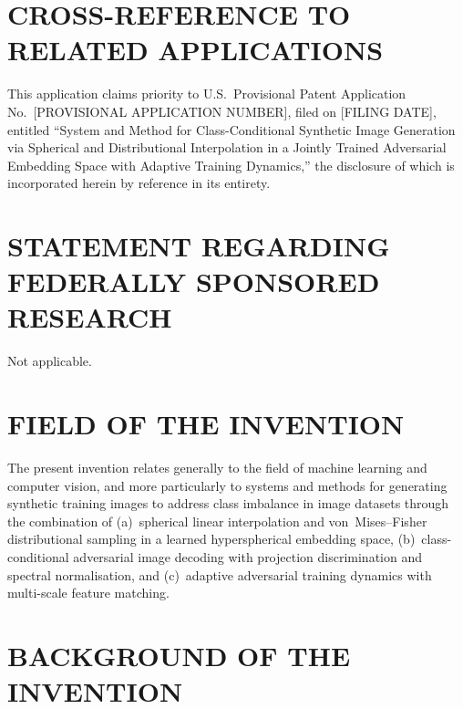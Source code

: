 \documentclass[12pt,letterpaper]{article}
\begin{document}
\newpage
\tableofcontents
\newpage

\section*{CROSS-REFERENCE TO RELATED APPLICATIONS}

This application claims priority to U.S.\ Provisional Patent Application
No.\ [PROVISIONAL APPLICATION NUMBER], filed on [FILING DATE], entitled
``System and Method for Class-Conditional Synthetic Image Generation via
Spherical and Distributional Interpolation in a Jointly Trained Adversarial
Embedding Space with Adaptive Training Dynamics,'' the disclosure of which
is incorporated herein by reference in its entirety.

\section*{STATEMENT REGARDING FEDERALLY SPONSORED RESEARCH}

Not applicable.

\section*{FIELD OF THE INVENTION}

The present invention relates generally to the field of machine learning and
computer vision, and more particularly to systems and methods for generating
synthetic training images to address class imbalance in image datasets through
the combination of (a)~spherical linear interpolation and von~Mises--Fisher
distributional sampling in a learned hyperspherical embedding space,
(b)~class-conditional adversarial image decoding with projection
discrimination and spectral normalisation, and (c)~adaptive adversarial
training dynamics with multi-scale feature matching.

\section*{BACKGROUND OF THE INVENTION}
\end{document}
